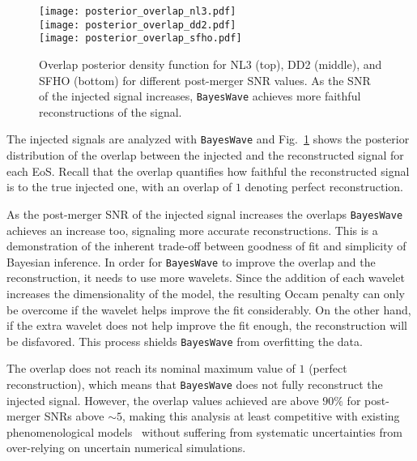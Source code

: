 \documentclass[aps,prd,amsmath,floats,floatfix, twocolumn,
superscriptaddress,nofootinbib,showpacs]{revtex4-1}
\begin{document}
%
\begin{figure}
\texttt{[image: posterior\_overlap\_nl3.pdf]}\\
\texttt{[image: posterior\_overlap\_dd2.pdf]}\\
\texttt{[image: posterior\_overlap\_sfho.pdf]}
\caption{\label{fig:overlapposteriors} Overlap posterior density function for NL3 (top), DD2 (middle), and SFHO (bottom) for different post-merger SNR values. As the SNR of the injected signal increases, {\tt BayesWave} achieves more faithful reconstructions of the signal.}
\end{figure}
%

The injected signals are analyzed with {\tt BayesWave} and Fig.~\ref{fig:overlapposteriors} shows the posterior distribution of the overlap between the injected and the reconstructed signal for each EoS. Recall that the overlap quantifies how faithful the reconstructed signal is to the true injected one, with an overlap of $1$ denoting perfect reconstruction.

As the post-merger SNR of the injected signal increases the overlaps {\tt BayesWave} achieves an increase too, signaling more accurate reconstructions. This is a demonstration of the inherent trade-off between goodness of fit and simplicity of Bayesian inference. In order for  {\tt BayesWave} to improve the overlap and the reconstruction, it needs to use more wavelets. Since the addition of each wavelet increases the dimensionality of the model, the resulting Occam penalty can only be overcome if the wavelet helps improve the fit considerably. On the other hand, if the extra wavelet does not help improve the fit enough, the reconstruction will be disfavored. This process shields {\tt BayesWave} from overfitting the data.

The overlap does not reach its nominal maximum value of $1$ (perfect reconstruction), which means that {\tt BayesWave} does not fully reconstruct the injected signal. However, the overlap values achieved are above $90\%$ for post-merger SNRs above $\sim5$, making this analysis at least competitive with existing phenomenological models~\cite{Bose:2017jvk,Yang:2017xlf} without suffering from systematic uncertainties from over-relying on uncertain numerical simulations.




\end{document}
